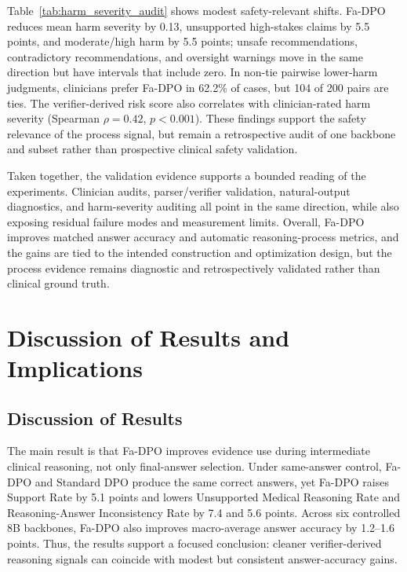 \documentclass[a4paper,fleqn,doubleblind]{cas-sc}
\begin{document}
Table~\ref{tab:harm_severity_audit} shows modest safety-relevant shifts. Fa-DPO reduces mean harm severity by 0.13, unsupported high-stakes claims by 5.5 points, and moderate/high harm by 5.5 points; unsafe recommendations, contradictory recommendations, and oversight warnings move in the same direction but have intervals that include zero. In non-tie pairwise lower-harm judgments, clinicians prefer Fa-DPO in 62.2\% of cases, but 104 of 200 pairs are ties. The verifier-derived risk score also correlates with clinician-rated harm severity (Spearman $\rho=0.42$, $p<0.001$). These findings support the safety relevance of the process signal, but remain a retrospective audit of one backbone and subset rather than prospective clinical safety validation.

Taken together, the validation evidence supports a bounded reading of the experiments. Clinician audits, parser/verifier validation, natural-output diagnostics, and harm-severity auditing all point in the same direction, while also exposing residual failure modes and measurement limits. Overall, Fa-DPO improves matched answer accuracy and automatic reasoning-process metrics, and the gains are tied to the intended construction and optimization design, but the process evidence remains diagnostic and retrospectively validated rather than clinical ground truth.

\FloatBarrier

\section{Discussion of Results and Implications}
\label{sec:discussion_implications}

\subsection{Discussion of Results}
The main result is that Fa-DPO improves evidence use during intermediate clinical reasoning, not only final-answer selection. Under same-answer control, Fa-DPO and Standard DPO produce the same correct answers, yet Fa-DPO raises Support Rate by 5.1 points and lowers Unsupported Medical Reasoning Rate and Reasoning-Answer Inconsistency Rate by 7.4 and 5.6 points. Across six controlled 8B backbones, Fa-DPO also improves macro-average answer accuracy by 1.2--1.6 points. Thus, the results support a focused conclusion: cleaner verifier-derived reasoning signals can coincide with modest but consistent answer-accuracy gains.
\end{document}
